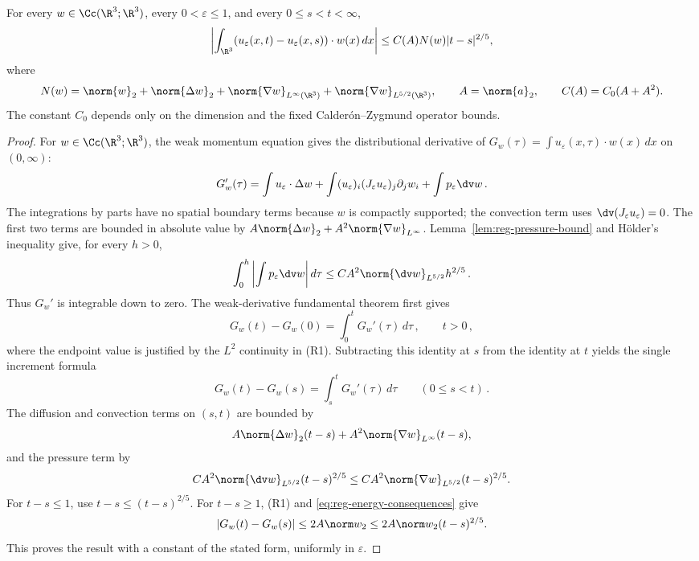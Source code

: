 \documentclass[11pt,reqno]{amsart}
\begin{document}
\begin{lemma}\label{lem:reg-equicontinuity}
For every $w\in\Cc(\R^3;\R^3)$, every $0<\varepsilon\leq1$, and every
$0\leq s<t<\infty$,
\[
  \left|\int_{\R^3}
      (u_\varepsilon(x,t)-u_\varepsilon(x,s))\cdot w(x)\,dx\right|
  \leq C(A)N(w)|t-s|^{2/5},
\]
where
\[
  N(w)=\norm{w}_2+\norm{\Delta w}_2+
       \norm{\nabla w}_{L^\infty(\R^3)}+
       \norm{\nabla w}_{L^{5/2}(\R^3)},
  \qquad A=\norm{a}_2,\qquad C(A)=C_0(A+A^2).
\]
The constant $C_0$ depends only on the dimension and the fixed
Calder\'on--Zygmund operator bounds.
\end{lemma}
\begin{proof}
For $w\in\Cc(\R^3;\R^3)$, the weak momentum equation gives the
distributional derivative of $G_w(\tau)=\int u_\varepsilon(x,\tau)\cdot
w(x)\,dx$ on $(0,\infty)$:
\begin{equation*}
  G_w'(\tau)=\int u_\varepsilon\cdot\Delta w
    +\int (u_\varepsilon)_i(J_\varepsilon u_\varepsilon)_j\partial_jw_i
    +\int p_\varepsilon\dv w\,.
\end{equation*}
The integrations by parts have no spatial boundary terms because $w$ is
compactly supported; the convection term uses
$\dv(J_\varepsilon u_\varepsilon)=0$. The first two terms are bounded in
absolute value by $A\norm{\Delta w}_2+A^2\norm{\nabla w}_{L^\infty}$.
Lemma~\ref{lem:reg-pressure-bound} and H\"older's inequality give, for every
$h>0$,
\begin{equation*}
  \int_0^h\left|\int p_\varepsilon\dv w\right|d\tau
   \le C A^2\norm{\dv w}_{L^{5/2}}h^{2/5}\,.
\end{equation*}
Thus $G_w'$ is integrable down to zero. The weak-derivative fundamental
theorem first gives
\begin{equation*}
  G_w(t)-G_w(0)=\int_0^tG_w'(\tau)\,d\tau\,,\qquad t>0\,,
\end{equation*}
where the endpoint value is justified by the $L^2$ continuity in (R1).
Subtracting this identity at $s$ from the identity at $t$ yields the single
increment formula
\begin{equation*}
  G_w(t)-G_w(s)=\int_s^tG_w'(\tau)\,d\tau
  \qquad(0\le s<t)\,.
\end{equation*}
The diffusion and convection terms on $(s,t)$ are bounded by
\begin{equation*}
  A\norm{\Delta w}_2(t-s)
   +A^2\norm{\nabla w}_{L^\infty}(t-s),
\end{equation*}
and the pressure term by
\begin{equation*}
  C A^2\norm{\dv w}_{L^{5/2}}(t-s)^{2/5}
   \le C A^2\norm{\nabla w}_{L^{5/2}}(t-s)^{2/5}.
\end{equation*}
For $t-s\le1$, use $t-s\le(t-s)^{2/5}$. For $t-s\ge1$, (R1) and
\eqref{eq:reg-energy-consequences} give
\begin{equation*}
  |G_w(t)-G_w(s)|\le2A\norm w_2
       \le2A\norm w_2(t-s)^{2/5}.
\end{equation*}
This proves the result with a constant of the stated form, uniformly in
$\varepsilon$.
\end{proof}
\end{document}
